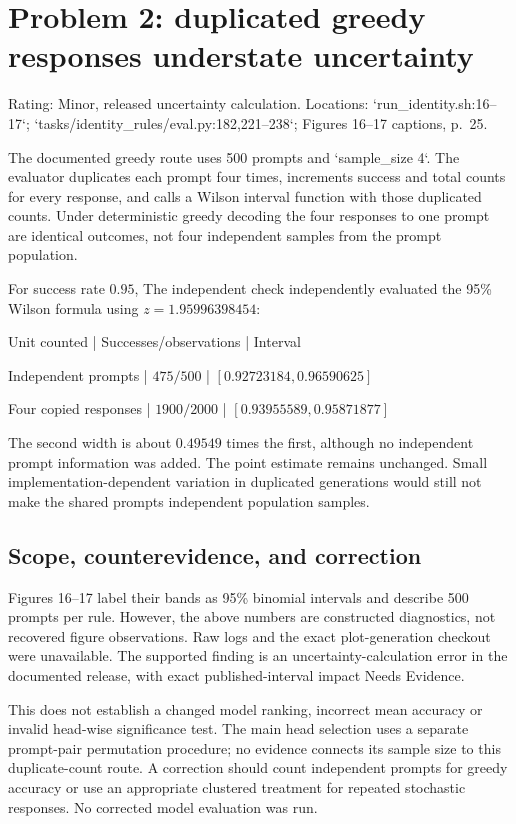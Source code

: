 \documentclass[10pt]{article}
\begin{document}
\section*{Problem 2: duplicated greedy responses understate uncertainty}
Rating: Minor, released uncertainty calculation. Locations: `run\_identity.sh:16–17`; `tasks/identity\_rules/eval.py:182,221–238`; Figures 16–17 captions, p. 25.\par
The documented greedy route uses 500 prompts and `sample\_size 4`. The evaluator duplicates each prompt four times, increments success and total counts for every response, and calls a Wilson interval function with those duplicated counts. Under deterministic greedy decoding the four responses to one prompt are identical outcomes, not four independent samples from the prompt population.\par
For success rate \(0.95\), The independent check independently evaluated the 95\% Wilson formula using \(z=1.95996398454\):\par
Unit counted | Successes/observations | Interval\par
Independent prompts | \(475/500\) | \([0.92723184,0.96590625]\)\par
Four copied responses | \(1900/2000\) | \([0.93955589,0.95871877]\)\par
The second width is about \(0.49549\) times the first, although no independent prompt information was added. The point estimate remains unchanged. Small implementation-dependent variation in duplicated generations would still not make the shared prompts independent population samples.\par
\subsection*{Scope, counterevidence, and correction}
Figures 16–17 label their bands as 95\% binomial intervals and describe 500 prompts per rule. However, the above numbers are constructed diagnostics, not recovered figure observations. Raw logs and the exact plot-generation checkout were unavailable. The supported finding is an uncertainty-calculation error in the documented release, with exact published-interval impact Needs Evidence.\par
This does not establish a changed model ranking, incorrect mean accuracy or invalid head-wise significance test. The main head selection uses a separate prompt-pair permutation procedure; no evidence connects its sample size to this duplicate-count route. A correction should count independent prompts for greedy accuracy or use an appropriate clustered treatment for repeated stochastic responses. No corrected model evaluation was run.\par
\end{document}
